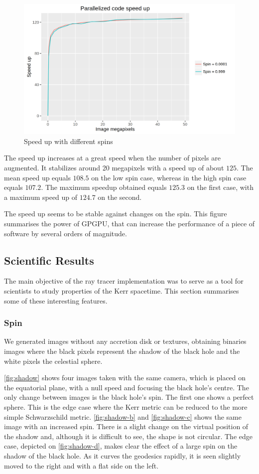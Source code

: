 \begin{figure}[bth]
	\myfloatalign
	\includegraphics[width=0.8\linewidth]{gfx/speedup}
	\caption[Speed up with different spins]{Speed up with different spins}
	\label{fig:speedup}
\end{figure}

The speed up increases at a great speed when the number of pixels are augmented. It stabilizes around 20 megapixels with a speed up of about $125$. The mean speed up equals $108.5$ on the low spin case, whereas in the high spin case equals $107.2$. The maximum speedup obtained equals $125.3$ on the first case, with a maximum speed up of $124.7$ on the second.

The speed up seems to be stable against changes on the spin. This figure summarises the power of \ac{GPGPU}, that can increase the performance of a piece of software by several orders of magnitude.


\subsection{Scientific Results}

The main objective of the ray tracer implementation was to serve as a tool for scientists to study properties of the Kerr spacetime. This section summarises some of these interesting features.

\subsubsection*{Spin}

We generated images without any accretion disk or textures, obtaining binaries images where the black pixels represent the shadow of the black hole and the white pixels the celestial sphere.

\autoref{fig:shadow} shows four images taken with the same camera, which is placed on the equatorial plane, with a null speed and focusing the black hole's centre. The only change between images is the black hole's spin. The first one shows a perfect sphere. This is the edge case where the Kerr metric can be reduced to the more simple Schwarzschild metric. \autoref{fig:shadow-b} and \autoref{fig:shadow-c} shows the same image with an increased spin. There is a slight change on the virtual position of the shadow and, although it is difficult to see, the shape is not circular. The edge case, depicted on \autoref{fig:shadow-d}, makes clear the effect of a large spin on the shadow of the black hole. As it curves the geodesics rapidly, it is seen slightly moved to the right and with a flat side on the left.

